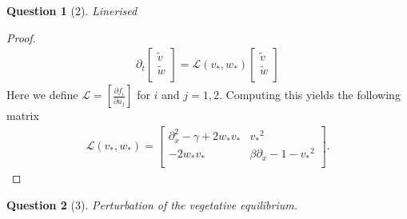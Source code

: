 \documentclass[11pt]{article}
\theoremstyle{quest}
\newtheorem*{question}{Question}
\newcommand{\Dp}{\partial}
\begin{document}
\begin{question}[2]
    Linerised 
\end{question}
\begin{proof}
    \begin{align*}
        \Dp_t
        \begin{bmatrix}
            \tilde{v} \\
            \tilde{w} \\
        \end{bmatrix}  = 
        \mathcal{L} \left( v_*, w_* \right)
        \begin{bmatrix}
            \tilde{v} \\
            \tilde{w} \\
        \end{bmatrix}   
    \end{align*}
    Here we define $\mathcal{L} = \left[ \frac{\Dp f_i }{ \Dp u_j } \right]$ for $i$ and $j=1,2$. 
    Computing this yields the following matrix 
    \begin{align*}
        \mathcal{L} \left( v_*, w_* \right)  =
        \begin{bmatrix}
            \Dp_{x}^{2} - \gamma + 2 w_* v_* & {v_*}^2 \\
            -2w_* v_* & \beta \Dp_x -1 - {v_*}^2 \\
        \end{bmatrix}
        .
    \end{align*}
\end{proof}
\clearpage
\begin{question}[3]
    Perturbation of the vegetative equilibrium. 
\end{question}
\end{document}
